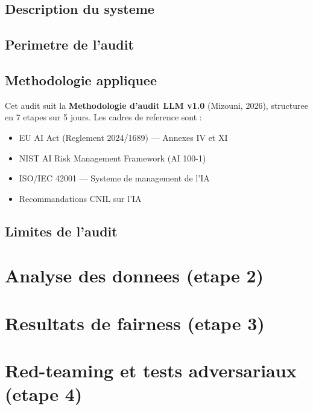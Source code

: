 \documentclass[a4paper,11pt]{article}
\begin{document}
\subsection{Description du systeme}

\subsection{Perimetre de l'audit}

\subsection{Methodologie appliquee}
Cet audit suit la \textbf{Methodologie d'audit LLM v1.0} (Mizouni, 2026),
structuree en 7 etapes sur 5 jours. Les cadres de reference sont :

\begin{itemize}
    \item EU AI Act (Reglement 2024/1689) --- Annexes IV et XI
    \item NIST AI Risk Management Framework (AI 100-1)
    \item ISO/IEC 42001 --- Systeme de management de l'IA
    \item Recommandations CNIL sur l'IA
\end{itemize}

\subsection{Limites de l'audit}

\section{Analyse des donnees (etape 2)}


\section{Resultats de fairness (etape 3)}


\section{Red-teaming et tests adversariaux (etape 4)}
\end{document}
